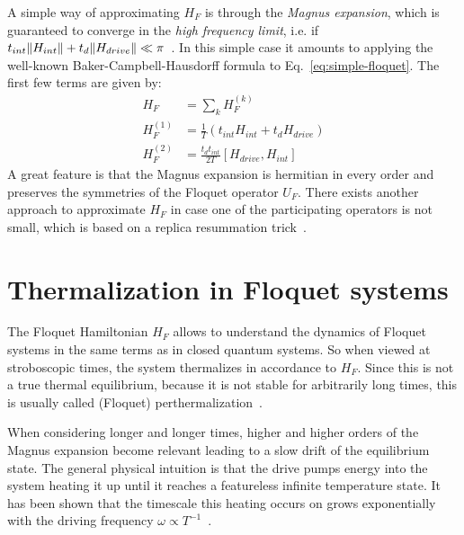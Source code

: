 A simple way of approximating $H_F$ is through the \emph{Magnus expansion}, which is guaranteed to converge in the \emph{high frequency limit}, i.e. if $t_{int}\lVert H_{int}\rVert+t_{d}\lVert H_{drive}\rVert \ll \pi $~\cite{blanesMagnusExpansionIts2009}. In this simple case it amounts to applying the well-known Baker-Campbell-Hausdorff formula to Eq.~\ref{eq:simple-floquet}. The first few terms are given by:
\begin{align}
	H_F &= \sum_k H_F^{(k)}\\
	H_F^{(1)} &= \frac{1}{T}\left(t_{int} H_{int} + t_{d}H_{drive}\right)\\
	H_F^{(2)} &= \frac{t_{d}t_{int}}{2T} \left[H_{drive}, H_{int}\right]
\end{align}
A great feature is that the Magnus expansion is hermitian in every order and preserves the symmetries of the Floquet operator $U_F$.
There exists another approach to approximate $H_F$ in case one of the participating operators is not small, which is based on a replica resummation trick~\cite{vajnaReplicaResummationBakerCampbellHausdorff2018}.

\section{Thermalization in Floquet systems}

The Floquet Hamiltonian $H_F$ allows to understand the dynamics of Floquet systems in the same terms as in closed quantum systems. So when viewed at stroboscopic times, the system thermalizes in accordance to $H_F$. Since this is not a true thermal equilibrium, because it is not stable for arbitrarily long times, this is usually called (Floquet) perthermalization~\cite{moriThermalizationPrethermalizationIsolated2018}.

When considering longer and longer times, higher and higher orders of the Magnus expansion become relevant leading to a slow drift of the equilibrium state. The general physical intuition is that the drive pumps energy into the system heating it up until it reaches a featureless infinite temperature state. It has been shown that the timescale this heating occurs on grows exponentially with the driving frequency $\omega\propto T^{-1}$~\cite{kuwaharaFloquetMagnusTheory2016,abaninRigorousTheoryManyBody2017,moriThermalizationPrethermalizationIsolated2018}.

%
%

